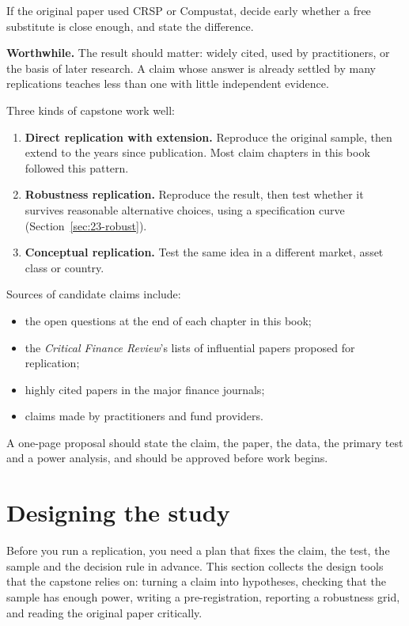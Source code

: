 If the original paper used CRSP or Compustat, decide early whether a free substitute is close enough, and state the difference.

\textbf{Worthwhile.} The result should matter: widely cited, used by practitioners, or the basis of later research. A claim whose answer is already settled by many replications teaches less than one with little independent evidence.

Three kinds of capstone work well:

\begin{enumerate}
  \item \textbf{Direct replication with extension.} Reproduce the original sample, then extend to the years since publication. Most claim chapters in this book followed this pattern.
  \item \textbf{Robustness replication.} Reproduce the result, then test whether it survives reasonable alternative choices, using a specification curve (Section~\ref{sec:23-robust}).
  \item \textbf{Conceptual replication.} Test the same idea in a different market, asset class or country.
\end{enumerate}

Sources of candidate claims include:

\begin{itemize}
  \item the open questions at the end of each chapter in this book;
  \item the \emph{Critical Finance Review}'s lists of influential papers proposed for replication;
  \item highly cited papers in the major finance journals;
  \item claims made by practitioners and fund providers.
\end{itemize}

A one-page proposal should state the claim, the paper, the data, the primary test and a power analysis, and should be approved before work begins.

\section{Designing the study}
\label{sec:23-design}

Before you run a replication, you need a plan that fixes the claim, the test, the sample and the decision rule in advance. This section collects the design tools that the capstone relies on: turning a claim into hypotheses, checking that the sample has enough power, writing a pre-registration, reporting a robustness grid, and reading the original paper critically.

